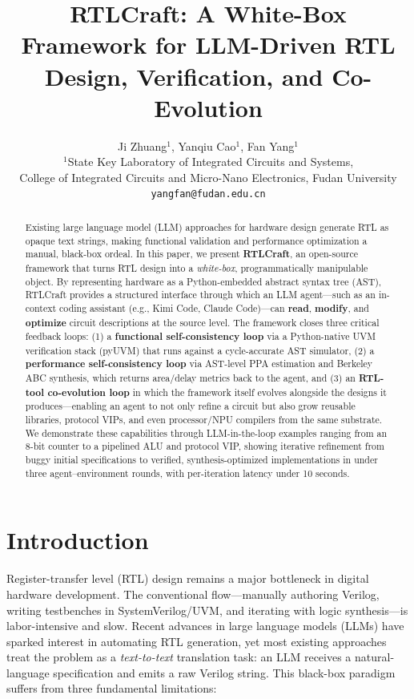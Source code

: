 \documentclass[11pt]{article}
\title{\textbf{RTLCraft: A White-Box Framework for LLM-Driven RTL Design, Verification, and Co-Evolution}}
\author{
Ji Zhuang$^{1}$, Yanqiu Cao$^{1}$, Fan Yang$^{1}$ \\
\small $^{1}$State Key Laboratory of Integrated Circuits and Systems, \\
\small College of Integrated Circuits and Micro-Nano Electronics, Fudan University \\
\small \texttt{yangfan@fudan.edu.cn}
}
\date{}
\begin{document}
\maketitle

\begin{abstract}
Existing large language model (LLM) approaches for hardware design generate RTL as opaque text strings, making functional validation and performance optimization a manual, black-box ordeal. In this paper, we present \textbf{RTLCraft}, an open-source framework that turns RTL design into a \textit{white-box}, programmatically manipulable object. By representing hardware as a Python-embedded abstract syntax tree (AST), RTLCraft provides a structured interface through which an LLM agent---such as an in-context coding assistant (e.g., Kimi Code, Claude Code)---can \textbf{read}, \textbf{modify}, and \textbf{optimize} circuit descriptions at the source level. The framework closes three critical feedback loops: (1) a \textbf{functional self-consistency loop} via a Python-native UVM verification stack (pyUVM) that runs against a cycle-accurate AST simulator, (2) a \textbf{performance self-consistency loop} via AST-level PPA estimation and Berkeley ABC synthesis, which returns area/delay metrics back to the agent, and (3) an \textbf{RTL-tool co-evolution loop} in which the framework itself evolves alongside the designs it produces---enabling an agent to not only refine a circuit but also grow reusable libraries, protocol VIPs, and even processor/NPU compilers from the same substrate. We demonstrate these capabilities through LLM-in-the-loop examples ranging from an 8-bit counter to a pipelined ALU and protocol VIP, showing iterative refinement from buggy initial specifications to verified, synthesis-optimized implementations in under three agent--environment rounds, with per-iteration latency under 10 seconds.
\end{abstract}

\section{Introduction}
\label{sec:intro}

Register-transfer level (RTL) design remains a major bottleneck in digital hardware development. The conventional flow---manually authoring Verilog, writing testbenches in SystemVerilog/UVM, and iterating with logic synthesis---is labor-intensive and slow. Recent advances in large language models (LLMs) have sparked interest in automating RTL generation, yet most existing approaches treat the problem as a \textit{text-to-text} translation task: an LLM receives a natural-language specification and emits a raw Verilog string. This black-box paradigm suffers from three fundamental limitations:
\end{document}
